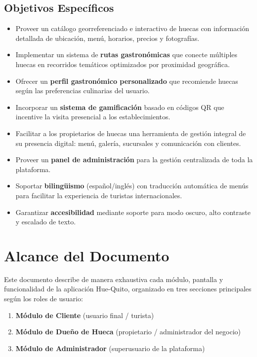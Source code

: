 \documentclass[11pt, a4paper, oneside]{report}
\begin{document}
\subsection{Objetivos Específicos}
\begin{itemize}
  \item Proveer un catálogo georreferenciado e interactivo de huecas con información detallada de ubicación, menú, horarios, precios y fotografías.
  \item Implementar un sistema de \textbf{rutas gastronómicas} que conecte múltiples huecas en recorridos temáticos optimizados por proximidad geográfica.
  \item Ofrecer un \textbf{perfil gastronómico personalizado} que recomiende huecas según las preferencias culinarias del usuario.
  \item Incorporar un \textbf{sistema de gamificación} basado en códigos QR que incentive la visita presencial a los establecimientos.
  \item Facilitar a los propietarios de huecas una herramienta de gestión integral de su presencia digital: menú, galería, sucursales y comunicación con clientes.
  \item Proveer un \textbf{panel de administración} para la gestión centralizada de toda la plataforma.
  \item Soportar \textbf{bilingüismo} (español/inglés) con traducción automática de menús para facilitar la experiencia de turistas internacionales.
  \item Garantizar \textbf{accesibilidad} mediante soporte para modo oscuro, alto contraste y escalado de texto.
\end{itemize}

\section{Alcance del Documento}

Este documento describe de manera exhaustiva cada módulo, pantalla y funcionalidad de la aplicación Hue-Quito, organizado en tres secciones principales según los roles de usuario:

\begin{enumerate}
  \item \textbf{Módulo de Cliente} (usuario final / turista)
  \item \textbf{Módulo de Dueño de Hueca} (propietario / administrador del negocio)
  \item \textbf{Módulo de Administrador} (superusuario de la plataforma)
\end{enumerate}
\end{document}
